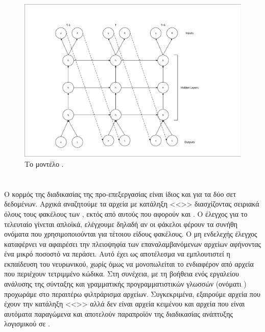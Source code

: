 \begin{figure}[h]
	\includegraphics[width=\textwidth, trim = 4 4 4 4, clip, keepaspectratio]{images/l-char-rnn.pdf}
	\centering 
	\caption{Το μοντέλο .}
	\label{fig:l-char-rnn}
\end{figure}

\section{}

Ο κορμός της διαδικασίας της προ-επεξεργασίας είναι ίδιος και για τα δύο σετ δεδομένων. 
Αρχικά αναζητούμε τα αρχεία με κατάληξη <<>> διασχίζοντας σειριακά όλους τους φακέλους των , εκτός από αυτούς που αφορούν  και .
Ο έλεγχος για το τελευταίο γίνεται απλοϊκά, ελέγχουμε δηλαδή αν οι φάκελοι φέρουν τα συνήθη ονόματα που χρησιμοποιούνται για τέτοιου είδους φακέλους.
Ο μη ενδελεχής έλεγχος καταφέρνει να αφαιρέσει την πλειοψηφία των επαναλαμβανόμενων αρχείων αφήνοντας ένα μικρό ποσοστό να περάσει.
Αυτό έχει ως αποτέλεσμα να εμπλουτιστεί η εκπαίδευση του νευρωνικού, χωρίς όμως να μονοπωλείται το ενδιαφέρον από αρχεία που περιέχουν τετριμμένο κώδικα.
Στη συνέχεια, με τη βοήθεια ενός εργαλείου ανάλυσης της σύνταξης και γραμματικής προγραμματιστικών γλωσσών (ονόματι ) προχωράμε στο περαιτέρω φιλτράρισμα αρχείων.
Συγκεκριμένα, εξαιρούμε αρχεία που έχουν την κατάληξη <<>> αλλά δεν είναι αρχεία κειμένου και αρχεία που είναι αυτόματα παραγώμενα και αποτελούν παραπροϊόν της διαδικασίας ανάπτυξης λογισμικού σε .

